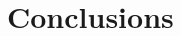 \documentclass{revtex4}
\begin{document}
\section{}


\section{}


\section{Conclusions}



\appendix

\begin{thebibliography}{0}

\end{thebibliography}
\end{document}

